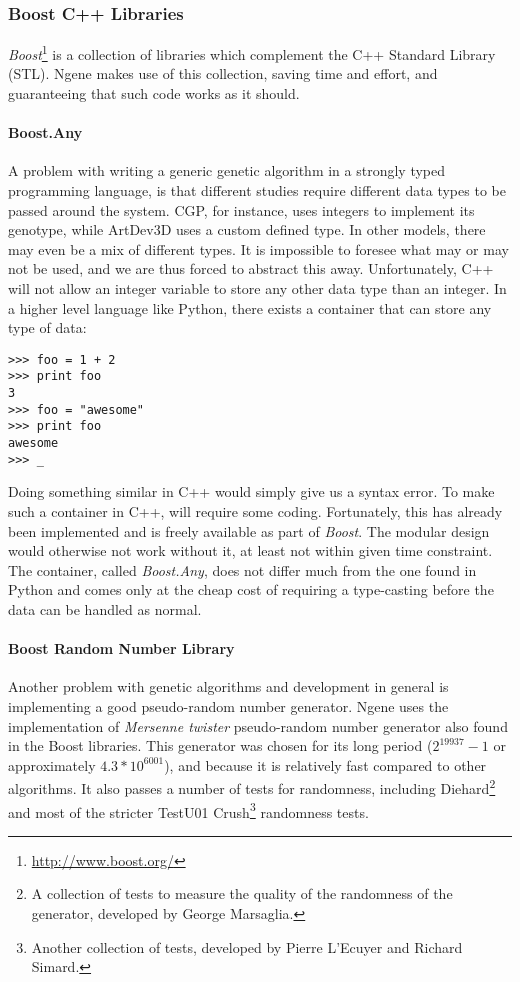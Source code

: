 \subsubsection{Boost C++ Libraries}
\emph{Boost}\footnote{\url{http://www.boost.org/}} is a collection of libraries which complement the C++ Standard Library (STL). Ngene makes use of this collection, saving time and effort, and guaranteeing that such code works as it should.

\paragraph{\textbf{Boost.Any}}\cite{henney2001}
A problem with writing a generic genetic algorithm in a strongly typed programming language, is that different studies require different data types to be passed around the system. CGP, for instance, uses integers to implement its genotype, while ArtDev3D uses a custom defined type. In other models, there may even be a mix of different types. It is impossible to foresee what may or may not be used, and we are thus forced to abstract this away. Unfortunately, C++ will not allow an integer variable to store any other data type than an integer. In a higher level language like Python, there exists a container that can store any type of data:

\begin{verbatim}
>>> foo = 1 + 2
>>> print foo
3
>>> foo = "awesome"
>>> print foo
awesome
>>> _
\end{verbatim}

Doing something similar in C++ would simply give us a syntax error. To make such a container in C++, will require some coding. Fortunately, this has already been implemented and is freely available as part of \emph{Boost}. The modular design would otherwise not work without it, at least not within given time constraint. The container, called \emph{Boost.Any}, does not differ much from the one found in Python and comes only at the cheap cost of requiring a type-casting before the data can be handled as normal.

\paragraph{\textbf{Boost Random Number Library}}\cite{maurer2000}
Another problem with genetic algorithms and development in general is implementing a good pseudo-random number generator. Ngene uses the implementation of \emph{Mersenne twister} pseudo-random number generator also found in the Boost libraries. This generator was chosen for its long period ($2^{19937}-1$ or approximately $4.3*10^{6001}$), and because it is relatively fast compared to other algorithms. It also passes a number of tests for randomness, including Diehard\footnote{A collection of tests to measure the quality of the randomness of the generator, developed by George Marsaglia.} and most of the stricter TestU01 Crush\footnote{Another collection of tests, developed by Pierre L'Ecuyer and Richard Simard.} randomness tests.

